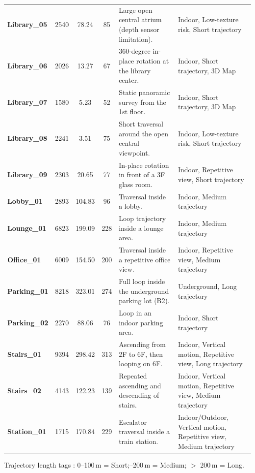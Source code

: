 \begin{table}[t]
\begin{threeparttable}
{\begin{tabular}{lccc p{5.5cm} p{4.2cm}}
\textbf{Library\_05}    & 2540  & 78.24  & 85  & Large open central atrium (depth sensor limitation). & Indoor, Low-texture risk, Short trajectory \\
\textbf{Library\_06}    & 2026  & 13.27  & 67  & 360-degree in-place rotation at the library center. & Indoor, Short trajectory, 3D Map \\
\textbf{Library\_07}    & 1580  & 5.23   & 52  & Static panoramic survey from the 1st floor. & Indoor, Short trajectory, 3D Map \\
\textbf{Library\_08}    & 2241  & 3.51   & 75  & Short traversal around the open central viewpoint. & Indoor, Low-texture risk, Short trajectory \\
\textbf{Library\_09}    & 2303  & 20.65  & 77  & In-place rotation in front of a 3F glass room. & Indoor, Repetitive view, Short trajectory \\
\textbf{Lobby\_01}      & 2893  & 104.83 & 96  & Traversal inside a lobby. & Indoor, Medium trajectory \\
\textbf{Lounge\_01}     & 6823  & 199.09 & 228 & Loop trajectory inside a lounge area. & Indoor, Medium trajectory \\
\textbf{Office\_01}     & 6009  & 154.50 & 200 & Traversal inside a repetitive office view. & Indoor, Repetitive view, Medium trajectory \\
\textbf{Parking\_01}    & 8218  & 323.01 & 274 & Full loop inside the underground parking lot (B2). & Underground, Long trajectory \\
\textbf{Parking\_02}    & 2270  & 88.06  & 76  & Loop in an indoor parking area. & Indoor, Short trajectory \\
\textbf{Stairs\_01}     & 9394  & 298.42 & 313 & Ascending from 2F to 6F, then looping on 6F. & Indoor, Vertical motion, Repetitive view, Long trajectory \\
\textbf{Stairs\_02}     & 4143  & 122.23 & 139 & Repeated ascending and descending of stairs. & Indoor, Vertical motion, Repetitive view, Medium trajectory \\
\textbf{Station\_01}    & 1715  & 170.84 & 229 & Escalator traversal inside a train station. & Indoor/Outdoor, Vertical motion, Repetitive view, Medium trajectory \\
\midrule
\end{tabular}
}%
\begin{tablenotes}[flushleft]
\item \footnotesize Trajectory length tags : 0--100\,m = Short;--200\,m = Medium;\; $>$ 200\,m = Long.
\end{tablenotes}
\vspace{-3mm}
\end{threeparttable}
\label{dataset_summary}
\end{table}